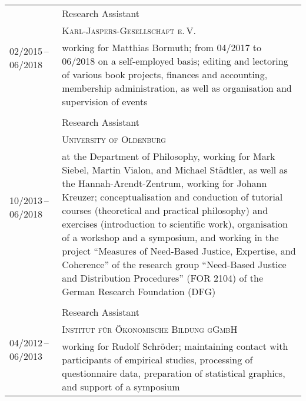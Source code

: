 \documentclass[a4paper,10pt]{article}
\begin{document}
\begin{longtable}{p{2.5cm}p{11cm}}
\\
\multirow{3}{2.5cm}{\footnotesize{02/2015\,--\,06/2018}} & Research Assistant\\
& \textsc{Karl-Jaspers-Gesellschaft e.\,V.}\\
& \footnotesize{working for Matthias Bormuth; from 04/2017 to 06/2018 on a self-employed basis; editing and lectoring of various book projects, finances and accounting, membership administration, as well as organisation and supervision of events}\\
\\
\multirow{3}{2.5cm}{\footnotesize{10/2013\,--\,06/2018}} & Research Assistant\\
& \textsc{University of Oldenburg}\\
& \footnotesize{at the Department of Philosophy, working for Mark Siebel, Martin Vialon, and Michael Städtler, as well as the Hannah-Arendt-Zentrum, working for Johann Kreuzer; conceptualisation and conduction of tutorial courses (theoretical and practical philosophy) and exercises (introduction to scientific work), organisation of a workshop and a symposium, and working in the project \enquote{Measures of Need-Based Justice, Expertise, and Coherence} of the research group \enquote{Need-Based Justice and Distribution Procedures} (FOR 2104) of the German Research Foundation (DFG)}\\
\\
\multirow{3}{2.5cm}{\footnotesize{04/2012\,--\,06/2013}} & Research Assistant\\
& \textsc{Institut für Ökonomische Bildung gGmbH}\\
& \footnotesize{working for Rudolf Schröder; maintaining contact with participants of empirical studies, processing of questionnaire data, preparation of statistical graphics, and support of a symposium}\\
\end{longtable}


\clearpage
\end{document}
